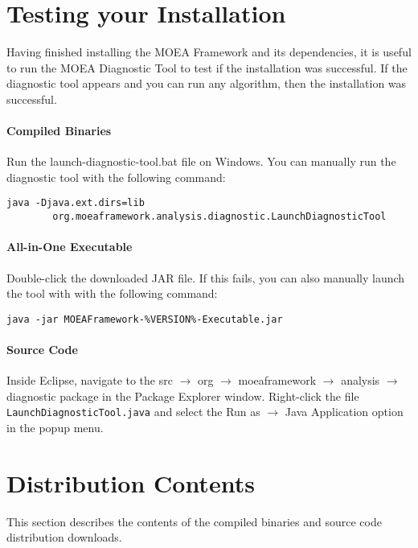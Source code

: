 \section{Testing your Installation}
Having finished installing the MOEA Framework and its dependencies, it is useful to run the MOEA Diagnostic Tool to test if the installation was successful.  If the diagnostic tool appears and you can run any algorithm, then the installation was successful.

\paragraph{Compiled Binaries}
Run the launch-diagnostic-tool.bat file on Windows.  You can manually run the diagnostic tool with the following command:

\begin{lstlisting}[language=Plaintext]
java -Djava.ext.dirs=lib
		org.moeaframework.analysis.diagnostic.LaunchDiagnosticTool
\end{lstlisting}

\paragraph{All-in-One Executable}
Double-click the downloaded JAR file.  If this fails, you can also manually launch the tool with with the following command:

\begin{lstlisting}[language=Plaintext]
java -jar MOEAFramework-%VERSION%-Executable.jar
\end{lstlisting}

\paragraph{Source Code}
Inside Eclipse, navigate to the src $\rightarrow$ org $\rightarrow$ moeaframework $\rightarrow$ analysis $\rightarrow$ diagnostic package in the Package Explorer window.  Right-click the file \texttt{LaunchDiagnosticTool.java} and select the Run as $\rightarrow$ Java Application option in the popup menu.

\section{Distribution Contents}
This section describes the contents of the compiled binaries and source code distribution downloads.

